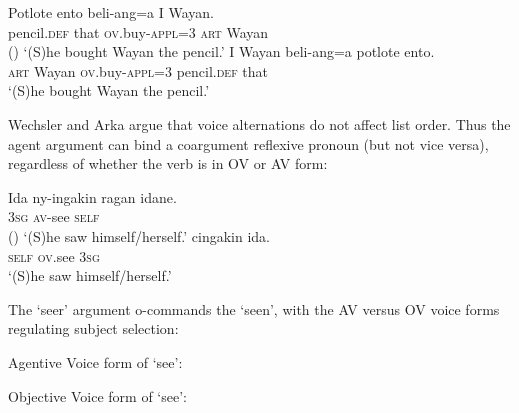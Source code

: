 \documentclass[output=paper,biblatex,babelshorthands,newtxmath,draftmode,colorlinks, citecolor=brown]{langscibook}
\begin{document}
\eal
\label{bal2}
\ex
\gll Potlote             ento beli-ang=a                      I            Wayan.  \\
     pencil.\textsc{def} that \textsc{ov}.buy-\textsc{appl}=3 \textsc{art} Wayan   \\\hfill()
\glt `(S)he bought Wayan the pencil.'
\ex
\gll I            Wayan beli-ang=a                      potlote             ento.   \\
     \textsc{art} Wayan \textsc{ov}.buy-\textsc{appl}=3 pencil.\textsc{def} that   \\
\glt `(S)he bought Wayan the pencil.'
\zl

\noindent
Wechsler and Arka argue that  voice alternations do not affect \argst
list order.  Thus the agent argument can bind a coargument reflexive pronoun (but not vice versa),
regardless of whether the verb is in OV or AV form:

\eal
\label{bal3}
\ex
\gll Ida          ny-ingakin      ragan idane. \\
     \textsc{3sg} \textsc{av}-see \textsc{self}\\\hfill()
\glt ‘(S)he saw himself/herself.’
\ex
{} cingakin        ida. \\
     \textsc{self} \textsc{ov}.see \textsc{3sg} \\
\glt ‘(S)he saw himself/herself.’
\zl

\noindent
The `seer' argument o-commands the `seen', with the AV versus
OV voice forms regulating subject selection:

\begin{exe} 
	\label{avsee}
\ex	Agentive Voice form of `see': \\
\end{exe}

\begin{exe} 
	\label{ovsee}
\ex	Objective Voice form of `see': \\
\end{exe}
\end{document}
